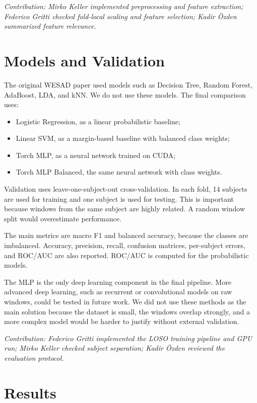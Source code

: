 \documentclass[10pt,a4paper,twocolumn]{article}
\newcommand{\sectioncontrib}[1]{\textit{Contribution: #1}}
\begin{document}
\sectioncontrib{Mirko Keller implemented preprocessing and feature extraction; Federico Gritti checked fold-local scaling and feature selection; Kadir {\"O}zden summarized feature relevance.}

\section{Models and Validation}

The original WESAD paper used models such as Decision Tree, Random Forest, AdaBoost, LDA, and kNN. We do not use these models. The final comparison uses:

\begin{itemize}
    \item Logistic Regression, as a linear probabilistic baseline;
    \item Linear SVM, as a margin-based baseline with balanced class weights;
    \item Torch MLP, as a neural network trained on CUDA;
    \item Torch MLP Balanced, the same neural network with class weights.
\end{itemize}

Validation uses leave-one-subject-out cross-validation. In each fold, 14 subjects are used for training and one subject is used for testing. This is important because windows from the same subject are highly related. A random window split would overestimate performance.

The main metrics are macro F1 and balanced accuracy, because the classes are imbalanced. Accuracy, precision, recall, confusion matrices, per-subject errors, and ROC/AUC are also reported. ROC/AUC is computed for the probabilistic models.

The MLP is the only deep learning component in the final pipeline. More advanced deep learning, such as recurrent or convolutional models on raw windows, could be tested in future work. We did not use these methods as the main solution because the dataset is small, the windows overlap strongly, and a more complex model would be harder to justify without external validation.

\sectioncontrib{Federico Gritti implemented the LOSO training pipeline and GPU run; Mirko Keller checked subject separation; Kadir {\"O}zden reviewed the evaluation protocol.}

\section{Results}
\end{document}
